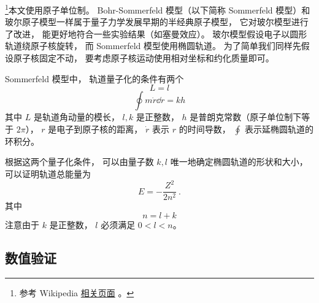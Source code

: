 

\footnote{参考 Wikipedia \href{https://en.wikipedia.org/wiki/Old_quantum_theory}{相关页面}
。}本文使用原子单位制。 Bohr-Sommerfeld 模型（以下简称 Sommerfeld 模型）和玻尔原子模型一样属于量子力学发展早期的半经典原子模型， 它对玻尔模型进行了改进， 能更好地符合一些实验结果（如塞曼效应）。 玻尔模型假设电子以圆形轨道绕原子核旋转， 而 Sommerfeld 模型使用椭圆轨道。 为了简单我们同样先假设原子核固定不动， 要考虑原子核运动使用相对坐标和约化质量即可。

Sommerfeld 模型中， 轨道量子化的条件有两个
\begin{equation}\label{eq_BohrEc_4}
L = l
\end{equation}
\begin{equation}\label{eq_BohrEc_3}
\oint m\dot r \dd{r} = kh
\end{equation}
其中 $L$ 是轨道角动量的模长， $l, k$ 是正整数， $h$ 是普朗克常数（原子单位制下等于 $2\pi$）， $r$ 是电子到原子核的距离， $\dot r$ 表示 $r$ 的时间导数， $\oint$ 表示延椭圆轨道的环积分。

根据这两个量子化条件， 可以由量子数 $k, l$ 唯一地确定椭圆轨道的形状和大小， 可以证明轨道总能量为
\begin{equation}\label{eq_BohrEc_5}
E = -\frac{Z^2}{2n^2}~.
\end{equation}
其中
\begin{equation}\label{eq_BohrEc_2}
n = l + k
\end{equation}
注意由于 $k$ 是正整数， $l$ 必须满足 $0 < l < n$。

\subsection{数值验证}

